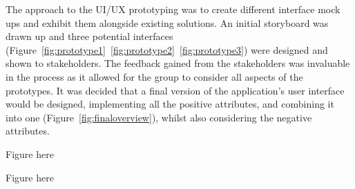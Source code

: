 The approach to the UI/UX prototyping was to create different interface mock ups and exhibit them alongside existing solutions. An initial storyboard was drawn up and three potential interfaces (Figure~\ref{fig:prototype1}~\ref{fig:prototype2}~\ref{fig:prototype3}) were designed and shown to stakeholders. The feedback gained from the stakeholders was invaluable in the process as it allowed for the group to consider all aspects of the prototypes. It was decided that a final version of the application's user interface would be designed, implementing all the positive attributes, and combining it into one (Figure~\ref{fig:finaloverview}), whilst also considering the negative attributes.

Figure here




\newpage

Figure here

